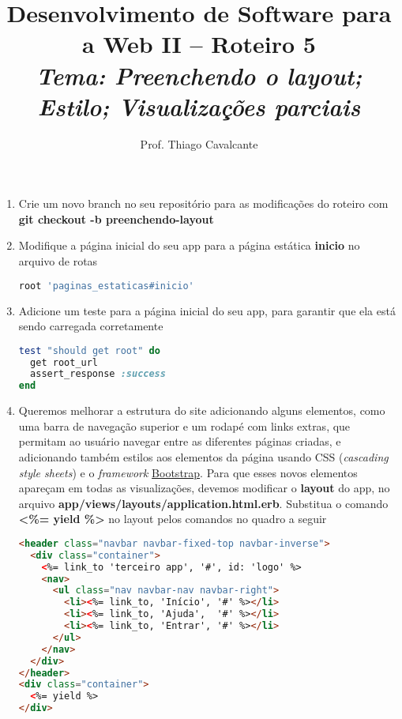 \documentclass[a4paper,12pt]{article}
\title{Desenvolvimento de Software para a Web II -- Roteiro 5 \\
\Large \textit{Tema: Preenchendo o layout; Estilo; Visualizações parciais}}
\author{Prof. Thiago Cavalcante}
\date{}
\begin{document}
\maketitle

\sloppy
\raggedright

\begin{enumerate}
  \item Crie um novo branch no seu repositório para as modificações do roteiro com \textbf{git checkout -b preenchendo-layout}

  \item Modifique a página inicial do seu app para a página estática \textbf{inicio} no arquivo de rotas

  \begin{lstlisting}[language=Ruby, title={config/routes.rb}]
root 'paginas_estaticas#inicio'
  \end{lstlisting}

  \item Adicione um teste para a página inicial do seu app, para garantir que ela está sendo carregada corretamente

  \begin{lstlisting}[language=Ruby, title={test/controllers/paginas\_estaticas\_controller\_test.rb}]
test "should get root" do
  get root_url
  assert_response :success
end
  \end{lstlisting}

  \item Queremos melhorar a estrutura do site adicionando alguns elementos, como uma barra de navegação superior e um rodapé com links extras, que permitam ao usuário navegar entre as diferentes páginas criadas, e adicionando também estilos aos elementos da página usando CSS (\textit{cascading style sheets}) e o \textit{framework} \href{https://getbootstrap.com/docs/3.4/}{Bootstrap}. Para que esses novos elementos apareçam em todas as visualizações, devemos modificar o \textbf{layout} do app, no arquivo \textbf{app/views/layouts/application.html.erb}. Substitua o comando \textbf{<\%= yield \%>} no layout pelos comandos no quadro a seguir

  \begin{lstlisting}[language=html, title={app/views/layouts/application.html.erb}, basicstyle=\scriptsize]
<header class="navbar navbar-fixed-top navbar-inverse">
  <div class="container">
    <%= link_to 'terceiro app', '#', id: 'logo' %>
    <nav>
      <ul class="nav navbar-nav navbar-right">
        <li><%= link_to, 'Início', '#' %></li>
        <li><%= link_to, 'Ajuda',  '#' %></li>
        <li><%= link_to, 'Entrar', '#' %></li>
      </ul>
    </nav>
  </div>
</header>
<div class="container">
  <%= yield %>
</div>
  \end{lstlisting}


\end{enumerate}
\end{document}
